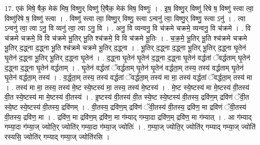 \documentclass[17pt]{extarticle}
\begin{document}
17. एक॑ मिषे॒ षैक॒ मेक॑ मिष॒ विष्णु॒र् विष्णु॑ रि॒षैक॒ मेक॑ मिष॒ विष्णुः॑ । . इ॒ष॒ विष्णु॒र् विष्णु॑ रिषे ष॒ विष्णु॑ स्त्वा त्वा॒ विष्णु॑रिषे ष॒ विष्णु॑ स्त्वा । . विष्णु॑ स्त्वा त्वा॒ विष्णु॒र् विष्णु॒ स्त्वा ऽन्वनु॑ त्वा॒ विष्णु॒र् विष्णु॒ स्त्वा ऽनु॑ । . त्वा ऽन्वनु॑ त्वा॒ त्वा ऽनु॒ वि व्यनु॑ त्वा॒ त्वा ऽनु॒ वि । . अनु॒ वि व्यन्वनु॒ वि च॑क्रमे चक्रमे॒ व्यन्वनु॒ वि च॑क्रमे । . वि च॑क्रमे चक्रमे॒ वि वि च॑क्रमे भू॒तिर् भू॒ति श्च॑क्रमे॒ वि वि च॑क्रमे भू॒तिः । . च॒क्र॒मे॒ भू॒तिर् भू॒ति श्च॑क्रमे चक्रमे भू॒तिर् द॒द्ध्ना द॒द्ध्ना भू॒ति श्च॑क्रमे चक्रमे भू॒तिर् द॒द्ध्ना । . भू॒तिर् द॒द्ध्ना द॒द्ध्ना भू॒तिर् भू॒तिर् द॒द्ध्ना घृ॒तेन॑ घृ॒तेन॑ द॒द्ध्ना भू॒तिर् भू॒तिर् द॒द्ध्ना घृ॒तेन॑ । . द॒द्ध्ना घृ॒तेन॑ घृ॒तेन॑ द॒द्ध्ना द॒द्ध्ना घृ॒तेन॑ वर्द्धतां ॅवर्द्धताम् घृ॒तेन॑ द॒द्ध्ना द॒द्ध्ना घृ॒तेन॑ वर्द्धताम् । . घृ॒तेन॑ वर्द्धतां ॅवर्द्धताम् घृ॒तेन॑ घृ॒तेन॑ वर्द्धता॒म् तस्य॒ तस्य॑ वर्द्धताम् घृ॒तेन॑ घृ॒तेन॑ वर्द्धता॒म् तस्य॑ । . व॒र्द्ध॒ता॒म् तस्य॒ तस्य॑ वर्द्धतां ॅवर्द्धता॒म् तस्य॑ मा मा॒ तस्य॑ वर्द्धतां ॅवर्द्धता॒म् तस्य॑ मा । . तस्य॑ मा मा॒ तस्य॒ तस्य॑ मे॒ष्ट स्ये॒ष्टस्य॑ मा॒ तस्य॒ तस्य॑ मे॒ष्टस्य॑ । . मे॒ष्ट स्ये॒ष्टस्य॑ मा मे॒ष्टस्य॑ वी॒तस्य॑ वी॒त स्ये॒ष्टस्य॑ मा मे॒ष्टस्य॑ वी॒तस्य॑ । . इ॒ष्टस्य॑ वी॒तस्य॑ वी॒त स्ये॒ष्ट स्ये॒ष्टस्य॑ वी॒तस्य॒ द्रवि॑ण॒म् द्रवि॑णं ॅवी॒त स्ये॒ष्ट स्ये॒ष्टस्य॑ वी॒तस्य॒ द्रवि॑णम् । . वी॒तस्य॒ द्रवि॑ण॒म् द्रवि॑णं ॅवी॒तस्य॑ वी॒तस्य॒ द्रवि॑ण॒ मा द्रवि॑णं ॅवी॒तस्य॑ वी॒तस्य॒ द्रवि॑ण॒ मा । . द्रवि॑ण॒ मा द्रवि॑ण॒म् द्रवि॑ण॒ मा ग॑म्याद् गम्या॒दा द्रवि॑ण॒म् द्रवि॑ण॒ मा ग॑म्यात् । . आ ग॑म्याद् गम्या॒दा ग॑म्या॒ज् ज्योति॒र् ज्योति॑र् गम्या॒दा ग॑म्या॒ज् ज्योतिः॑ । . ग॒म्या॒ज् ज्योति॒र् ज्योति॑र् गम्याद् गम्या॒ज् ज्योति॑ रस्यसि॒ ज्योति॑र् गम्याद् गम्या॒ज् ज्योति॑रसि । \newline
\end{document}
